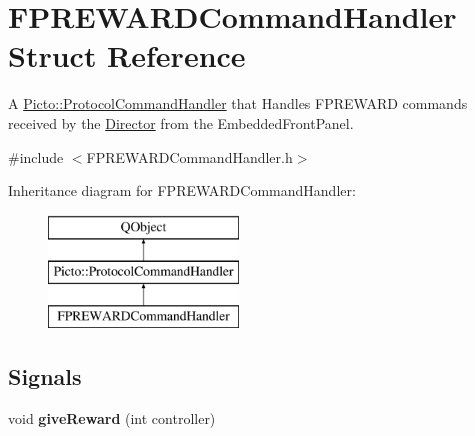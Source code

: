 \hypertarget{struct_f_p_r_e_w_a_r_d_command_handler}{\section{F\-P\-R\-E\-W\-A\-R\-D\-Command\-Handler Struct Reference}
\label{struct_f_p_r_e_w_a_r_d_command_handler}
}


A \hyperlink{struct_picto_1_1_protocol_command_handler}{Picto\-::\-Protocol\-Command\-Handler} that Handles F\-P\-R\-E\-W\-A\-R\-D commands received by the \hyperlink{class_director}{Director} from the Embedded\-Front\-Panel.  




{\ttfamily \#include $<$F\-P\-R\-E\-W\-A\-R\-D\-Command\-Handler.\-h$>$}

Inheritance diagram for F\-P\-R\-E\-W\-A\-R\-D\-Command\-Handler\-:\begin{figure}[H]
\begin{center}
\leavevmode
\includegraphics[height=3.000000cm]{struct_f_p_r_e_w_a_r_d_command_handler}
\end{center}
\end{figure}
\subsection*{Signals}
\begin{DoxyCompactItemize}
\item 
\hypertarget{struct_f_p_r_e_w_a_r_d_command_handler_a32688cea5421be0b79d7b06acabd6354}{void {\bfseries give\-Reward} (int controller)}\label{struct_f_p_r_e_w_a_r_d_command_handler_a32688cea5421be0b79d7b06acabd6354}

\end{DoxyCompactItemize}
